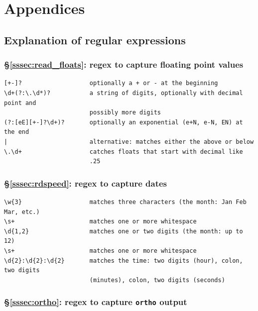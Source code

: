 \documentclass[12pt]{article}
\newenvironment{code}{\captionsetup{type=listing}}{\par\addvspace{\baselineskip}}
\begin{document}


\section{Appendices}\label{sec:appendix}

\subsection{Explanation of regular expressions}\label{ssec:regex}

\subsubsection*{\S\ref{sssec:read_floats}: regex to capture floating point values}

\begin{code}\begin{verbatim}
[+-]?                   optionally a + or - at the beginning
\d+(?:\.\d*)?           a string of digits, optionally with decimal point and 
                        possibly more digits
(?:[eE][+-]?\d+)?       optionally an exponential (e+N, e-N, EN) at the end
|                       alternative: matches either the above or below
\.\d+                   catches floats that start with decimal like
                        .25
\end{verbatim}
\end{code}

\subsubsection*{\S\ref{sssec:rdspeed}: regex to capture dates}

\begin{code}\begin{verbatim}
\w{3}                   matches three characters (the month: Jan Feb Mar, etc.)
\s+                     matches one or more whitespace
\d{1,2}                 matches one or two digits (the month: up to 12)
\s+                     matches one or more whitespace
\d{2}:\d{2}:\d{2}       matches the time: two digits (hour), colon, two digits
                        (minutes), colon, two digits (seconds)
\end{verbatim}
\end{code}

\subsubsection*{\S\ref{sssec:ortho}: regex to capture \texttt{ortho} output}
\end{document}
